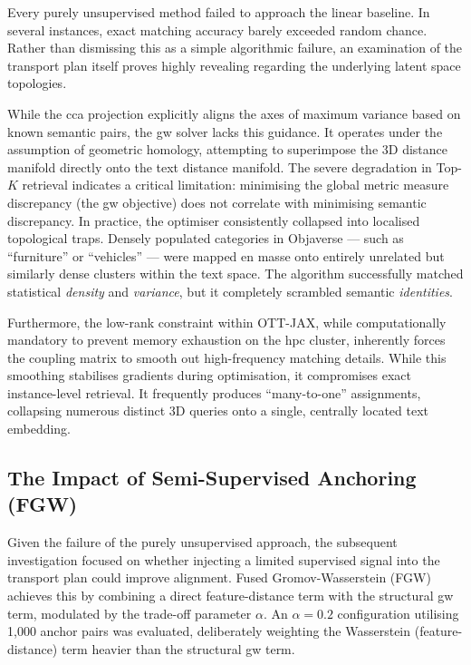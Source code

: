 Every purely unsupervised method failed to approach the linear baseline. In several instances, exact matching accuracy barely exceeded random chance. Rather than dismissing this as a simple algorithmic failure, an examination of the transport plan itself proves highly revealing regarding the underlying latent space topologies.

While the \gls{cca} projection explicitly aligns the axes of maximum variance based on known semantic pairs, the \gls{gw} solver lacks this guidance. It operates under the assumption of geometric homology, attempting to superimpose the 3D distance manifold directly onto the text distance manifold. The severe degradation in Top-$K$ retrieval indicates a critical limitation: minimising the global metric measure discrepancy (the \gls{gw} objective) does not correlate with minimising semantic discrepancy. In practice, the optimiser consistently collapsed into localised topological traps. Densely populated categories in Objaverse --- such as ``furniture'' or ``vehicles'' --- were mapped en masse onto entirely unrelated but similarly dense clusters within the text space. The algorithm successfully matched statistical \textit{density} and \textit{variance}, but it completely scrambled semantic \textit{identities}.

Furthermore, the low-rank constraint within OTT-JAX, while computationally mandatory to prevent memory exhaustion on the \gls{hpc} cluster, inherently forces the coupling matrix to smooth out high-frequency matching details. While this smoothing stabilises gradients during optimisation, it compromises exact instance-level retrieval. It frequently produces ``many-to-one'' assignments, collapsing numerous distinct 3D queries onto a single, centrally located text embedding.

\subsection{The Impact of Semi-Supervised Anchoring (FGW)}
\label{subsec:fgw_results}

Given the failure of the purely unsupervised approach, the subsequent investigation focused on whether injecting a limited supervised signal into the transport plan could improve alignment. Fused Gromov-Wasserstein (FGW) achieves this by combining a direct feature-distance term with the structural \gls{gw} term, modulated by the trade-off parameter $\alpha$. An $\alpha = 0.2$ configuration utilising 1,000 anchor pairs was evaluated, deliberately weighting the Wasserstein (feature-distance) term heavier than the structural \gls{gw} term.


